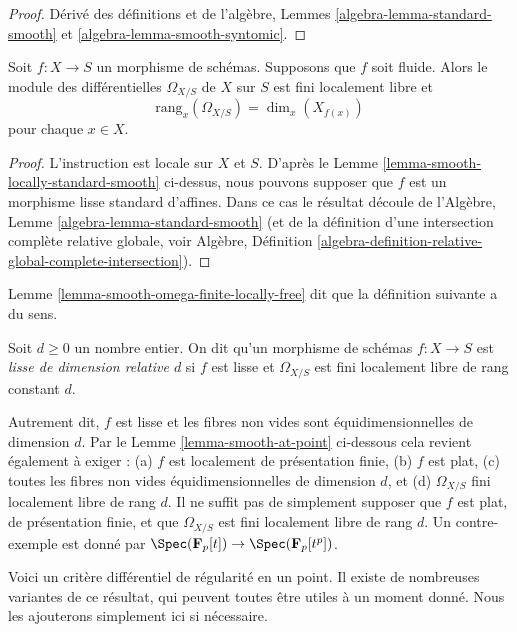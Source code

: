 \begin{proof}
Dérivé des définitions
et de l'algèbre, Lemmes \ref{algebra-lemma-standard-smooth}
et \ref{algebra-lemma-smooth-syntomic}.
\end{proof}

\begin{lemma}
\label{lemma-smooth-omega-finite-locally-free}
Soit $f : X \to S$ un morphisme de schémas. Supposons que
$f$ soit fluide.
Alors le module des différentielles $\Omega_{X/S}$ de $X$ sur $S$
est fini localement libre et
$$
\text{rang}_x(\Omega_{X/S}) = \dim_x(X_{f(x)})
$$
pour chaque $x \in X$.
\end{lemma}

\begin{proof}
L'instruction est locale sur $X$
et $S$. D'après le Lemme \ref{lemma-smooth-locally-standard-smooth}
ci-dessus, nous pouvons supposer que $f$ est un morphisme
lisse standard d'affines.
Dans ce cas le résultat découle de l'Algèbre,
Lemme \ref{algebra-lemma-standard-smooth} (et de la définition d'une intersection
complète
relative globale, voir Algèbre, Définition \ref{algebra-definition-relative-global-complete-intersection}).
\end{proof}

\noindent
Lemme \ref{lemma-smooth-omega-finite-locally-free} dit que la définition
suivante a du sens.

\begin{definition}
\label{definition-smooth-relative-dimension}
Soit $d \geq 0$ un nombre entier. On dit qu'un morphisme de schémas $f : X \to S$ est {\it
lisse de dimension relative $d$} si $f$ est
lisse et $\Omega_{X/S}$ est fini localement libre de rang constant $d$.
\end{definition}

\noindent
Autrement dit, $f$ est lisse et les fibres non vides sont équidimensionnelles
de dimension $d$. Par le Lemme \ref{lemma-smooth-at-point} ci-dessous cela revient
également à exiger : (a) $f$ est localement de présentation finie, (b) $f$
est plat, (c) toutes les fibres non vides équidimensionnelles de dimension
$d$, et (d) $\Omega_{X/S}$ fini localement libre de rang $d$.
Il ne suffit pas de simplement supposer que $f$ est plat, de présentation
finie, et que $\Omega_{X/S}$ est fini localement libre de rang
$d$. Un contre-exemple est donné par $\Spec(\mathbf{F}_p[t]) \to \Spec(\mathbf{F}_p[t^p])$.

\medskip\noindent Voici
un critère différentiel de régularité en un point. Il existe de nombreuses
variantes de ce résultat, qui peuvent
toutes être utiles à un moment donné. Nous les ajouterons simplement ici
si nécessaire.

